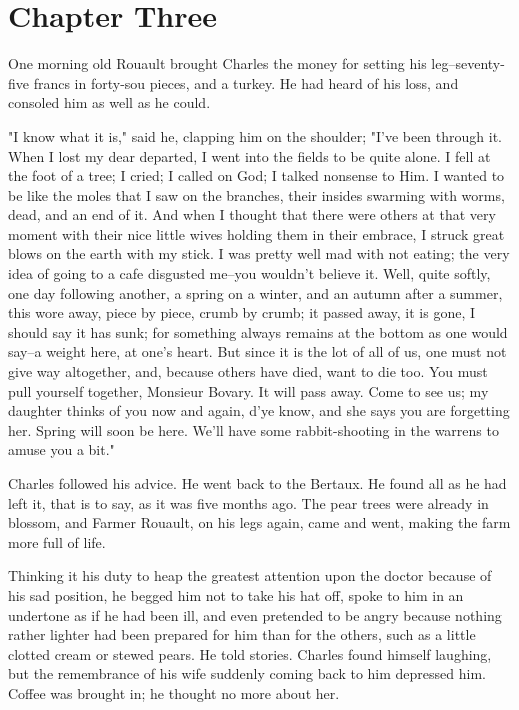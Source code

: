 \documentclass{tufte-book}
\begin{document}
\chapter*{Chapter Three}

One morning old Rouault brought Charles the money for setting his
leg--seventy-five francs in forty-sou pieces, and a turkey. He had heard
of his loss, and consoled him as well as he could.

"I know what it is," said he, clapping him on the shoulder; "I've been
through it. When I lost my dear departed, I went into the fields to be
quite alone. I fell at the foot of a tree; I cried; I called on God; I
talked nonsense to Him. I wanted to be like the moles that I saw on the
branches, their insides swarming with worms, dead, and an end of it.
And when I thought that there were others at that very moment with their
nice little wives holding them in their embrace, I struck great blows on
the earth with my stick. I was pretty well mad with not eating; the very
idea of going to a cafe disgusted me--you wouldn't believe it. Well,
quite softly, one day following another, a spring on a winter, and an
autumn after a summer, this wore away, piece by piece, crumb by crumb;
it passed away, it is gone, I should say it has sunk; for something
always remains at the bottom as one would say--a weight here, at one's
heart. But since it is the lot of all of us, one must not give way
altogether, and, because others have died, want to die too. You must
pull yourself together, Monsieur Bovary. It will pass away. Come to see
us; my daughter thinks of you now and again, d'ye know, and she says
you are forgetting her. Spring will soon be here. We'll have some
rabbit-shooting in the warrens to amuse you a bit."

Charles followed his advice. He went back to the Bertaux. He found all
as he had left it, that is to say, as it was five months ago. The pear
trees were already in blossom, and Farmer Rouault, on his legs again,
came and went, making the farm more full of life.

Thinking it his duty to heap the greatest attention upon the doctor
because of his sad position, he begged him not to take his hat off,
spoke to him in an undertone as if he had been ill, and even pretended
to be angry because nothing rather lighter had been prepared for him
than for the others, such as a little clotted cream or stewed pears. He
told stories. Charles found himself laughing, but the remembrance of his
wife suddenly coming back to him depressed him. Coffee was brought in;
he thought no more about her.
\end{document}

